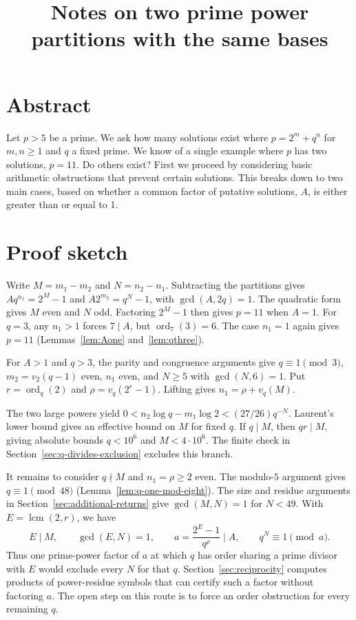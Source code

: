 \documentclass[11pt]{article}
\title{Notes on two prime power partitions with the same bases}
\author{}
\date{}
\begin{document}
\maketitle
\section*{Abstract}

Let $p > 5$ be a prime. We ask how many solutions exist where $p = 2^m + q^n$ for $m, n \geq 1$ and $q$ a fixed prime.
We know of a single example where $p$ has two solutions, $p =  11$. Do others exist? First we proceed by
considering basic arithmetic obstructions that prevent certain solutions. This breaks down to two main cases,
based on whether a common factor of putative solutions, $A$, is either greater than or equal to 1.

\section*{Proof sketch}

Write $M=m_1-m_2$ and $N=n_2-n_1$. Subtracting the partitions
gives $Aq^{n_1}=2^M-1$ and $A2^{m_2}=q^N-1$, with $\gcd(A,2q)=1$.
The quadratic form gives $M$ even and $N$ odd. Factoring $2^M-1$
then gives $p=11$ when $A=1$. For $q=3$, any $n_1>1$ forces $7\mid A$,
but $\operatorname{ord}_7(3)=6$. The case $n_1=1$ again gives $p=11$
(Lemmas~\ref{lem:Aone} and~\ref{lem:qthree}).

For $A>1$ and $q>3$, the parity and congruence arguments give
$q\equiv1\pmod3$, $m_2=v_2(q-1)$ even, $n_1$ even, and
$N\ge5$ with $\gcd(N,6)=1$. Put $r=\operatorname{ord}_q(2)$ and
$\rho=v_q(2^r-1)$. Lifting gives $n_1=\rho+v_q(M)$.

The two large powers yield
$0<n_2\log q-m_1\log 2<(27/26)q^{-N}$.
Laurent's lower bound gives an effective bound on $M$ for fixed $q$.
If $q\mid M$, then $qr\mid M$, giving absolute bounds $q<10^6$
and $M<4\cdot10^6$. The finite check in
Section~\ref{sec:q-divides-exclusion} excludes this branch.

It remains to consider $q\nmid M$ and $n_1=\rho\ge2$ even.
The modulo-$5$ argument gives $q\equiv1\pmod{48}$
(Lemma~\ref{lem:q-one-mod-eight}). The size and residue arguments
in Section~\ref{sec:additional-returns} give $\gcd(M,N)=1$ for $N<49$.
With $E=\operatorname{lcm}(2,r)$, we have
\[
E\mid M,\qquad \gcd(E,N)=1,\qquad
a=\frac{2^E-1}{q^\rho}\mid A,\qquad q^N\equiv1\pmod a.
\]
Thus one prime-power factor of $a$ at which $q$ has order sharing
a prime divisor with $E$ would exclude every $N$ for that $q$.
Section~\ref{sec:reciprocity} computes products of power-residue
symbols that can certify such a factor without factoring $a$.
The open step on this route is to force an order obstruction for every
remaining $q$.
\end{document}
